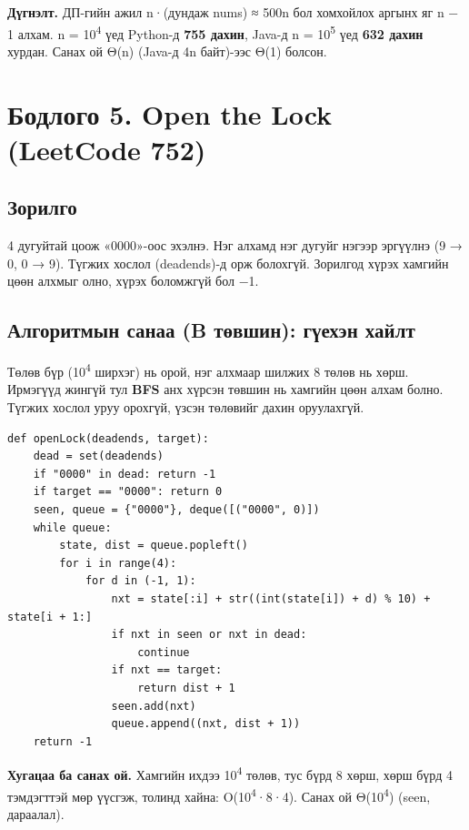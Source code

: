 \documentclass[11pt,a4paper]{article}
\renewcommand{\_}{\oldunderscore\allowbreak}
\begin{document}
\textbf{Дүгнэлт.} ДП-гийн ажил n·(дундаж nums) ≈ 500n бол хомхойлох аргынх яг n − 1 алхам. n = 10\textsuperscript{4} үед Python-д \textbf{755 дахин}, Java-д n = 10\textsuperscript{5} үед \textbf{632 дахин} хурдан. Санах ой Θ(n) (Java-д 4n байт)-ээс Θ(1) болсон.

\section{Бодлого 5. Open the Lock (LeetCode 752)}

\subsection{Зорилго}
4 дугуйтай цоож «0000»-оос эхэлнэ. Нэг алхамд нэг дугуйг нэгээр эргүүлнэ (9 → 0, 0 → 9). Түгжих хослол (deadends)-д орж болохгүй. Зорилгод хүрэх хамгийн цөөн алхмыг олно, хүрэх боломжгүй бол −1.

\subsection{Алгоритмын санаа (B төвшин): гүехэн хайлт}
Төлөв бүр (10\textsuperscript{4} ширхэг) нь орой, нэг алхмаар шилжих 8 төлөв нь хөрш. Ирмэгүүд жингүй тул \textbf{BFS} анх хүрсэн төвшин нь хамгийн цөөн алхам болно. Түгжих хослол уруу орохгүй, үзсэн төлөвийг дахин оруулахгүй.

\begin{Verbatim}
def openLock(deadends, target):
    dead = set(deadends)
    if "0000" in dead: return -1
    if target == "0000": return 0
    seen, queue = {"0000"}, deque([("0000", 0)])
    while queue:
        state, dist = queue.popleft()
        for i in range(4):
            for d in (-1, 1):
                nxt = state[:i] + str((int(state[i]) + d) % 10) + state[i + 1:]
                if nxt in seen or nxt in dead:
                    continue
                if nxt == target:
                    return dist + 1
                seen.add(nxt)
                queue.append((nxt, dist + 1))
    return -1
\end{Verbatim}

\textbf{Хугацаа ба санах ой.} Хамгийн ихдээ 10\textsuperscript{4} төлөв, тус бүрд 8 хөрш, хөрш бүрд 4 тэмдэгттэй мөр үүсгэж, толинд хайна: O(10\textsuperscript{4}·8·4). Санах ой Θ(10\textsuperscript{4}) (seen, дараалал).
\end{document}
